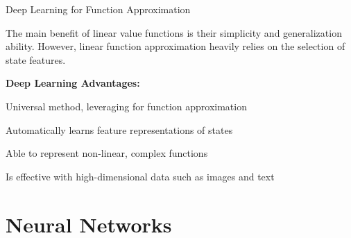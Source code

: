 
    

\begin{frame}[t]{Deep Learning for Function Approximation}

 The main benefit of linear value functions is their simplicity and generalization ability. However, linear function approximation heavily relies on the selection of state features.


\textbf{Deep Learning Advantages:}
\blist
    \item Universal method, leveraging  for function approximation
    \item Automatically learns feature representations of states
    \item Able to represent non-linear, complex functions
    \item Is effective with high-dimensional data such as images and text
\elist
    
\end{frame}

\section{Neural Networks}

